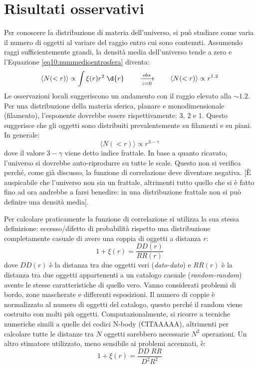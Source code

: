 \section{Risultati osservativi}
Per conoscere la distribuzione di materia dell'universo, si può studiare come varia il numero di oggetti al variare del raggio entro cui sono contenuti. Assumendo raggi sufficientemente grandi, la densità media dell'universo tende a zero e l'Equazione \ref{eq10:nummedioentrosfera} diventa:
\begin{equation}
    \langle N(<r)\rangle \propto \int \xi(r) r^2\; \d{r} \qquad \xrightarrow[z=0]{obs} \qquad \langle N(<r)\rangle \propto r^{1.2}
\end{equation}
Le osservazioni locali suggeriscono un andamento con il raggio elevato alla $\sim 1.2$. Per una distribuzione della materia sferica, planare e monodimensionale (filamento), l'esponente dovrebbe essere rispettivamente: $3$, $2$ e $1$. Questo suggerisce che gli oggetti sono distribuiti prevalentemente su filamenti e su piani. In generale:
\begin{equation}
    \langle N(<r)\rangle \propto r^{3-\gamma}
\end{equation}
dove il valore $3-\gamma$ viene detto indice frattale. In base a quanto ricavato, l'universo si dovrebbe auto-riprodurre su tutte le scale. Questo non si verifica perché, come già discusso, la funzione di correlazione deve diventare negativa. [È auspicabile che l'universo non sia un frattale, altrimenti tutto quello che si è fatto fino ad ora andrebbe a farsi benedire: in una distribuzione frattale non si può definire una densità media].

\vspace{1em}
Per calcolare praticamente la funzione di correlazione si utilizza la sua stessa definizione: eccesso/difetto di probabilità rispetto una distribuzione completamente casuale di avere una coppia di oggetti a distanza $r$:
\begin{equation}
    1+\xi(r)=\frac{DD(r)}{RR(r)}            
\end{equation}
dove $DD(r)$ è la distanza tra due oggetti veri (\textit{dato-dato}) e $RR(r)$ è la distanza tra due oggetti appartenenti a un catalogo casuale (\textit{random-random}) avente le stesse caratteristiche di quello vero. Vanno considerati problemi di bordo, zone mascherate e differenti esposizioni. Il numero di coppie è normalizzato al numero di oggetti del catalogo, questo perché il random viene costruito con molti più oggetti. Computazionalmente, si ricorre a tecniche numeriche simili a quelle dei codici N-body (CITAAAAA), altrimenti per calcolare tutte le distanze tra $N$ oggetti sarebbero necessarie $N^2$ operazioni. Un altro stimatore utilizzato, meno sensibile ai problemi accennati, è:
\begin{equation}
    1+\xi(r)= \frac{DD\; RR}{D^2R^2}
\end{equation}

